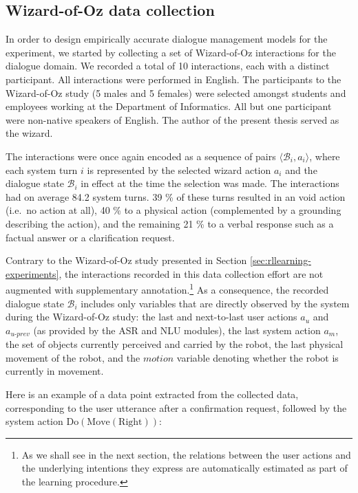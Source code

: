 \subsection{Wizard-of-Oz data collection}
\label{sec:wozcollection-exp3}

In order to design empirically accurate dialogue management models for the experiment, we started by collecting a set of Wizard-of-Oz interactions for the dialogue domain. We recorded a total of 10 interactions, each with a distinct participant. All interactions were performed in English. The participants to the Wizard-of-Oz study (5 males and 5 females) were selected amongst students and employees working at the Department of Informatics. All but one participant were non-native speakers of English. The author of the present thesis served as the wizard.

The interactions were once again encoded as a sequence of pairs $\langle \mathcal{B}_i, a_i \rangle$, where each system turn $i$ is represented by the selected wizard action $a_i$ and the dialogue state $\mathcal{B}_i$ in effect at the time the selection was made. The interactions had on average 84.2 system turns.  39 \% of these turns resulted in an void action (i.e.\ no action at all), 40 \% to a physical action (complemented by a grounding describing the action), and the remaining 21 \% to a verbal response such as a factual answer or a clarification request. 

Contrary to the Wizard-of-Oz study presented in Section \ref{sec:rllearning-experiments}, the interactions recorded in this data collection effort are not augmented with supplementary annotation.\footnote{As we shall see in the next section, the relations between the user actions and the underlying intentions they express are automatically estimated as part of the learning procedure.} As a consequence, the recorded dialogue state $\mathcal{B}_i$ includes only variables that are directly observed by the system during the Wizard-of-Oz study: the last and next-to-last user actions $a_u$ and $a_{u\mbox{-}prev}$ (as provided by the ASR and NLU modules), the last system action $a_m$, the set of objects currently perceived and carried by the robot, the last physical movement of the robot, and the $\mathit{motion}$ variable denoting whether the robot is currently in movement. 

Here is an example of a data point extracted from the collected data, corresponding to the user utterance  after a confirmation request, followed by the system action $\mathrm{Do(Move(Right))}$: 

